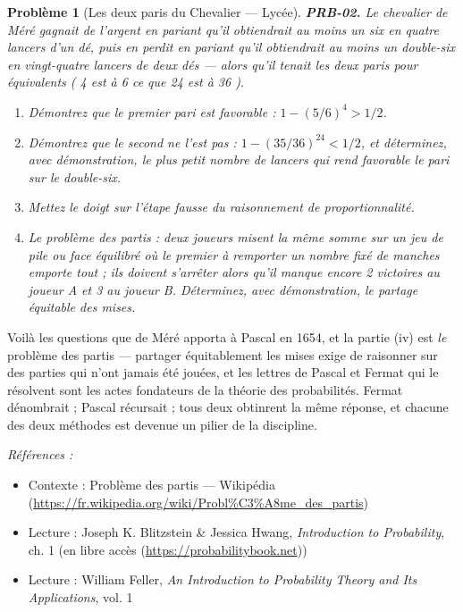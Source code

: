 \documentclass[11pt]{article}
\newtheorem{problem}{Problème}
\newenvironment{refs}{\par\small\noindent\emph{Références :}\begin{itemize}\setlength\itemsep{0pt}}{\end{itemize}\normalsize}
\begin{document}
\bigskip

\begin{problem}[{Les deux paris du Chevalier --- Lycée}]
\textbf{PRB-02.} Le chevalier de Méré gagnait de l'argent en pariant qu'il
obtiendrait au moins un six en quatre lancers d'un dé, puis en perdit en pariant qu'il obtiendrait
au moins un double-six en vingt-quatre lancers de deux dés --- alors qu'il tenait les deux paris
pour équivalents (\og{} 4 est à 6 ce que 24 est à 36 \fg{}).
\begin{enumerate}
\item[(i)] Démontrez que le premier pari est favorable :
$ 1 - (5/6)^4 > 1/2 $.
\item[(ii)] Démontrez que le second ne l'est pas :
$ 1 - (35/36)^{24} < 1/2 $, et déterminez, avec démonstration, le plus petit nombre de lancers
qui rend favorable le pari sur le double-six.
\item[(iii)] Mettez le doigt sur l'étape fausse du
raisonnement de proportionnalité.
\item[(iv)] Le problème des partis : deux joueurs misent la même somme sur un jeu de pile ou face
équilibré où le premier à remporter un nombre fixé de manches emporte tout ; ils doivent
s'arrêter alors qu'il manque encore 2 victoires au joueur A et 3 au joueur B. Déterminez, avec
démonstration, le partage équitable des mises.
\end{enumerate}

\end{problem}

\noindent Voilà les questions que de Méré apporta à Pascal en 1654, et la partie (iv) est
\textit{le} problème des partis --- partager équitablement les mises exige de raisonner sur des
parties qui n'ont jamais été jouées, et les lettres de Pascal et Fermat qui le résolvent sont les
actes fondateurs de la théorie des probabilités. Fermat dénombrait ; Pascal récursait ; tous deux
obtinrent la même réponse, et chacune des deux méthodes est devenue un pilier de la
discipline.

\begin{refs}
\item Contexte : Problème des partis --- Wikipédia (\url{https://fr.wikipedia.org/wiki/Probl%C3%A8me_des_partis})
\item Lecture : Joseph K. Blitzstein \& Jessica Hwang, \textit{Introduction to Probability}, ch. 1 (en libre accès (\url{https://probabilitybook.net}))
\item Lecture : William Feller, \textit{An Introduction to Probability Theory and Its Applications}, vol. 1
\end{refs}
\end{document}
